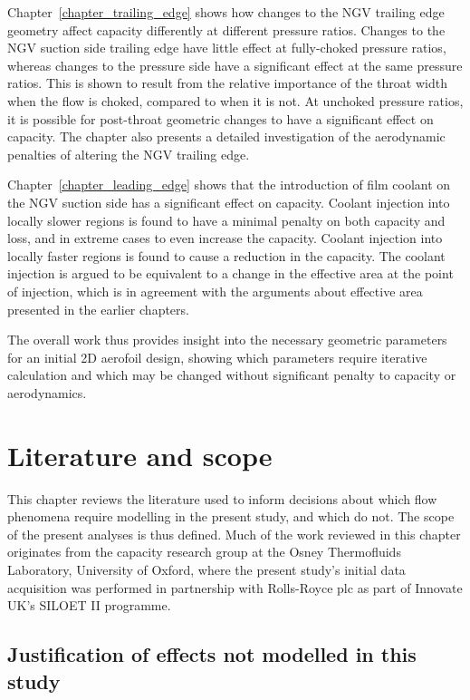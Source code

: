 \documentclass[a4paper, 11pt, oneside]{report}
\begin{document}
Chapter~\ref{chapter_trailing_edge} shows how changes to the NGV trailing edge geometry affect capacity differently at different pressure ratios. Changes to the NGV suction side trailing edge have little effect at fully-choked pressure ratios, whereas changes to the pressure side have a significant effect at the same pressure ratios. This is shown to result from the relative importance of the throat width when the flow is choked, compared to when it is not. At unchoked pressure ratios, it is possible for post-throat geometric changes to have a significant effect on capacity. The chapter also presents a detailed investigation of the aerodynamic penalties of altering the NGV trailing edge.

Chapter~\ref{chapter_leading_edge} shows that the introduction of film coolant on the NGV suction side has a significant effect on capacity. Coolant injection into locally slower regions is found to have a minimal penalty on both capacity and loss, and in extreme cases to even increase the capacity. Coolant injection into locally faster regions is found to cause a reduction in the capacity. The coolant injection is argued to be equivalent to a change in the effective area at the point of injection, which is in agreement with the arguments about effective area presented in the earlier chapters.

The overall work thus provides insight into the necessary geometric parameters for an initial 2D aerofoil design, showing which parameters require iterative calculation and which may be changed without significant penalty to capacity or aerodynamics.



\chapter{Literature and scope}
\label{chapter_literature_and_scope}

This chapter reviews the literature used to inform decisions about which flow phenomena require modelling in the present study, and which do not. The scope of the present analyses is thus defined. Much of the work reviewed in this chapter originates from the capacity research group at the Osney Thermofluids Laboratory, University of Oxford, where the present study's initial data acquisition was performed in partnership with Rolls-Royce plc as part of Innovate UK's SILOET II programme.

\section{Justification of effects not modelled in this study}
\label{justification_of_effects_not_modelled_in_this_study}
\end{document}
